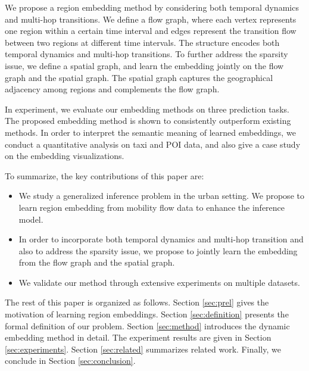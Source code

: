 We propose a region embedding method by considering both temporal dynamics and  multi-hop transitions. We define a flow graph, where each vertex represents one region within a certain time interval and edges represent the transition flow between two regions at different time intervals. The structure encodes both temporal dynamics and multi-hop transitions. To further address the sparsity issue, we define a spatial graph, and learn the embedding jointly on the flow graph and the spatial graph. The spatial graph captures the geographical adjacency among regions and complements the flow graph.

In experiment, we evaluate our embedding methods on three prediction tasks. The proposed embedding method is shown to consistently outperform existing methods. In order to interpret the semantic meaning of learned embeddings, we conduct a quantitative analysis on taxi and POI data, and also give a case study on the embedding visualizations.

To summarize, the key contributions of this paper are:
\begin{itemize}[leftmargin=*]
\item We study a generalized inference problem in the urban setting. We propose to learn region embedding from mobility flow data to enhance the inference model.
\item In order to incorporate both temporal dynamics and multi-hop transition and also to address the sparsity issue, we propose to jointly learn the embedding from the flow graph and the spatial graph. 
\item We validate our method through extensive experiments on multiple datasets.
\end{itemize}

The rest of this paper is organized as follows. Section \ref{sec:prel} gives the motivation of learning region embeddings. Section \ref{sec:definition} presents the formal definition of our problem. Section \ref{sec:method} introduces the dynamic embedding method in detail. The experiment results are given in Section \ref{sec:experiments}. Section \ref{sec:related} summarizes related work. Finally, we conclude in Section \ref{sec:conclusion}.